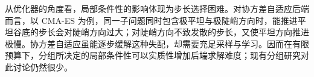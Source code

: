 从优化器的角度看，局部条件性的影响体现为步长选择困难。对协方差自适应后端而言，以 CMA-ES 为例，同一子问题同时包含极平坦与极陡峭方向时，能推进平坦谷底的步长会对陡峭方向过大；对陡峭方向不致发散的步长，又使平坦方向推进极慢。协方差自适应虽能逐步缓解这种失配，却需要充足采样与学习。因而在有限预算下，分组所决定的局部条件性可以实质性增加后端求解难度；现有分组研究对此讨论仍然很少。